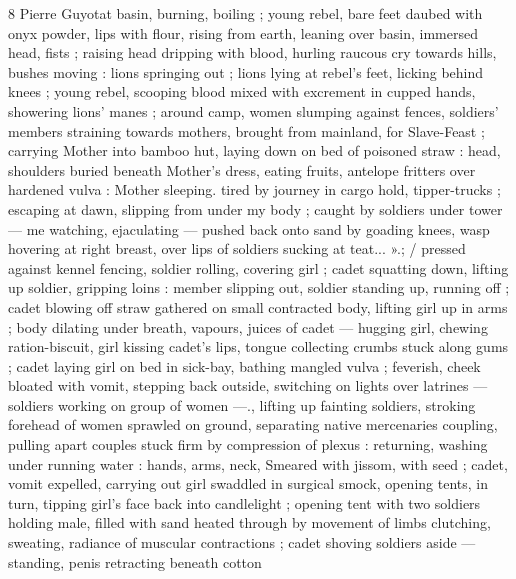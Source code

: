 8 Pierre Guyotat
basin, burning, boiling ; young rebel, bare feet daubed with onyx
powder, lips with flour, rising from earth, leaning over basin,
immersed head, fists ; raising head dripping with blood, hurling
raucous cry towards hills, bushes moving : lions springing out ; lions
lying at rebel's feet, licking behind knees ; young rebel, scooping
blood mixed with excrement in cupped hands, showering lions’
manes ; around camp, women slumping against fences, soldiers’
members straining towards mothers, brought from mainland, for
Slave-Feast ; carrying Mother into bamboo hut, laying down on bed
of poisoned straw : head, shoulders buried beneath Mother's dress,
eating fruits, antelope fritters over hardened vulva : Mother sleeping.
tired by journey in cargo hold, tipper-trucks ; escaping at dawn,
slipping from under my body ; caught by soldiers under tower — me
watching, ejaculating — pushed back onto sand by goading knees,
wasp hovering at right breast, over lips of soldiers sucking at teat...
».; / pressed against kennel fencing, soldier rolling, covering girl ;
cadet squatting down, lifting up soldier, gripping loins : member
slipping out, soldier standing up, running off ; cadet blowing off
straw gathered on small contracted body, lifting girl up in arms ; body
dilating under breath, vapours, juices of cadet — hugging girl,
chewing ration-biscuit, girl kissing cadet's lips, tongue collecting
crumbs stuck along gums ; cadet laying girl on bed in sick-bay,
bathing mangled vulva ; feverish, cheek bloated with vomit, stepping
back outside, switching on lights over latrines — soldiers working on
group of women —., lifting up fainting soldiers, stroking forehead of
women sprawled on ground, separating native mercenaries coupling,
pulling apart couples stuck firm by compression of plexus :
returning, washing under running water : hands, arms, neck,
Smeared with jissom, with seed ; cadet, vomit expelled, carrying out
girl swaddled in surgical smock, opening tents, in turn, tipping girl's
face back into candlelight ; opening tent with two soldiers holding
male, filled with sand heated through by movement of limbs
clutching, sweating, radiance of muscular contractions ; cadet
shoving soldiers aside — standing, penis retracting beneath cotton

